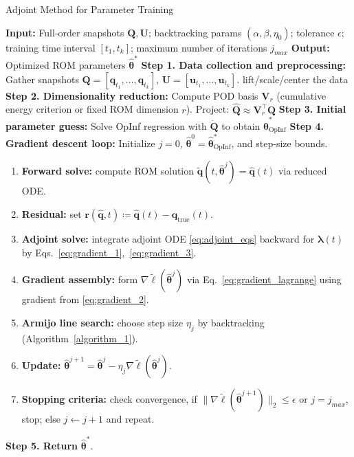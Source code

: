 \begin{center}
\begin{minipage}{0.95\textwidth}
\begin{algorithm}[H]
\caption{Adjoint Method for Parameter Training}\label{algorithm_2}
\SetAlgoNoLine
\textbf{Input:} Full-order snapshots $\mathbf{Q},\mathbf{U}$; backtracking params $(\alpha,\beta,\eta_0)$; tolerance $\epsilon$; training time interval $[t_1, t_k]$; maximum number of iterations $j_{max}$\;
\textbf{Output:} Optimized ROM parameters $\hat{\bm\theta}^*$\;
\vspace{0.3cm}
\textbf{Step 1. Data collection and preprocessing:} Gather snapshots $\mathbf{Q}=[\mathbf{q}_{t_1},\dots,\mathbf{q}_{t_k}]$, $\mathbf{U}=[\mathbf{u}_{t_1},\dots,\mathbf{u}_{t_k}]$.
\quad [Optional] lift/scale/center the data\;
\textbf{Step 2. Dimensionality reduction:} Compute POD basis $\mathbf{V}_r$ (cumulative energy criterion or fixed ROM dimension $r$). Project: $\hat{\mathbf{Q}} \approx \mathbf{V}_r^\top\mathbf{Q}$\;
\textbf{Step 3. Initial parameter guess:} Solve OpInf regression with $\dot{\mathbf{Q}}$ to obtain $\hat{\bm\theta}^{*}_{\text{OpInf}}$\;
\textbf{Step 4. Gradient descent loop:}
Initialize $j=0$, $\hat{\bm\theta}^0=\hat{\bm\theta}^{*}_{\text{OpInf}}$, and step-size bounds.
\begin{enumerate}[label=\arabic*.]
  \item \textbf{Forward solve:}
    compute ROM solution $\tilde{\mathbf{q}}(t,\hat{\bm\theta}^j) = \hat{\mathbf{q}}(t)$ via reduced ODE.
  \item \textbf{Residual:}
    set $\mathbf{r}(\hat{\mathbf{q}},t)\coloneqq\hat{\mathbf{q}}(t) - \hat{\mathbf{q}}_{\text{true}}(t)$.
  \item \textbf{Adjoint solve:}
    integrate adjoint ODE \eqref{eq:adjoint_eqs} backward for $\bm\lambda(t)$ by Eqs.~\eqref{eq:gradient_1},~\eqref{eq:gradient_3}.
  \item \textbf{Gradient assembly:}
    form $\nabla\tilde\ell(\hat{\bm\theta}^j)$ via Eq.~\eqref{eq:gradient_lagrange} using gradient from \eqref{eq:gradient_2}.
  \item \textbf{Armijo line search:}
    choose step size $\eta_j$ by backtracking (Algorithm~\ref{algorithm_1}).
  \item \textbf{Update:}
    $\hat{\bm\theta}^{j+1}=\hat{\bm\theta}^j-\eta_j\nabla\tilde\ell(\hat{\bm\theta}^j)$.
  \item \textbf{Stopping criteria:}
    check convergence, if $\|\nabla\tilde\ell(\hat{\bm\theta}^{j+1})\|_2\le\epsilon$ or $j=j_{max}$, stop; else $j\leftarrow j+1$ and repeat.
\end{enumerate}
\textbf{Step 5. Return} {$\hat{\bm\theta}^*$}.
\end{algorithm}
\end{minipage}
\end{center}
    

